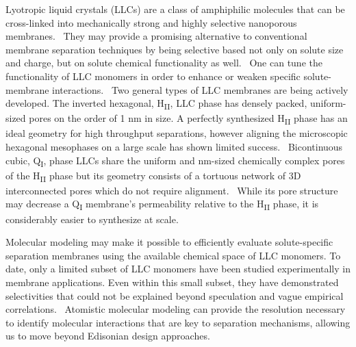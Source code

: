 \documentclass[12pt]{article}
\begin{document}
  Lyotropic liquid crystals (LLCs) are a class of amphiphilic molecules that can be 
  cross-linked into mechanically strong and highly selective nanoporous membranes.~\cite{gin_polymerized_2008}
  They may provide a promising alternative to conventional membrane separation techniques
  by being selective based not only on solute size and charge, but on solute chemical 
  functionality as well.~\cite{dischinger_application_2017} One can tune the functionality
  of LLC monomers in order to enhance or weaken specific solute-membrane interactions.~\cite{dischinger_effect_2017}
  Two general types of LLC membranes are being actively developed. The inverted hexagonal, 
  H\textsubscript{II}, LLC phase has densely packed, uniform-sized pores on the order of 1 nm
  in size. A perfectly synthesized H\textsubscript{II} phase has an ideal geometry for high
  throughput separations, however aligning the microscopic hexagonal mesophases on a large 
  scale has shown limited success.~\cite{feng_scalable_2014,feng_thin_2016} Bicontinuous cubic,
  Q\textsubscript{I}, phase LLCs share the uniform and nm-sized chemically complex pores of
  the H\textsubscript{II} phase but its geometry consists of a tortuous network of 3D 
  interconnected pores which do not require alignment.~\cite{carter_glycerol-based_2012} While 
  its pore structure may decrease a Q\textsubscript{I} membrane's permeability relative to the
  H\textsubscript{II} phase, it is considerably easier to synthesize at scale.
  
  Molecular modeling may make it possible to efficiently evaluate solute-specific separation
  membranes using the available chemical space of LLC monomers. To date, only a limited 
  subset of LLC monomers have been studied experimentally in membrane applications.
  \cite{carter_glycerol-based_2012,hatakeyama_nanoporous_2010,smith_ordered_1997,zhou_assembly_2003,resel_structural_2000}
  Even within this small subset, they have demonstrated selectivities that could not be
  explained beyond speculation and vague empirical correlations.~\cite{dischinger_application_2017}
  Atomistic molecular modeling can provide the resolution necessary to identify molecular 
  interactions that are key to separation mechanisms, allowing us to move beyond 
  Edisonian design approaches.
\end{document}
